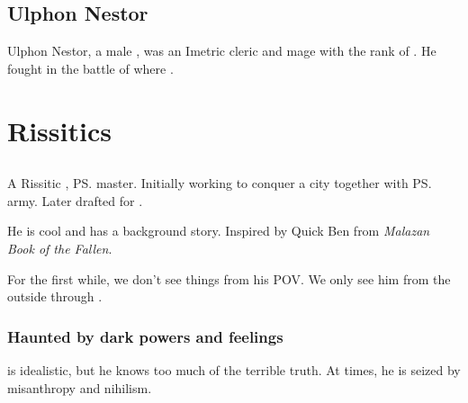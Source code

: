 \section{Ulphon Nestor}
Ulphon Nestor, a male \scatha, was an Imetric cleric and mage with the rank of \Ispan. 
He fought in the battle of \Forclin where . 























\chapter{Rissitics}
\section{\Dzasselid}
A Rissitic \Shessefkesad{}, \ps{\Shilred}{} master. Initially working to conquer a \Scyric{} city together with \ps{\Narkiza}{} army. Later drafted for . 

He is cool and has a background story. Inspired by Quick Ben from \emph{Malazan Book of the Fallen}. 

For the first while, we don't see things from his POV. We only see him from the outside through \Shilred. 









\subsection{Haunted by dark powers and feelings}
\Dzasselid{} is idealistic, but he knows too much of the terrible truth. 
At times, he is seized by misanthropy and nihilism. 


